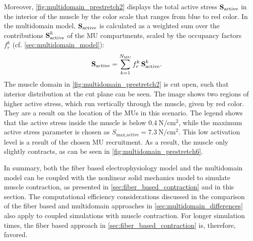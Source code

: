Moreover, \cref{fig:multidomain_prestretch2} displays the total active stress  $\textbf{S}_\text{active}$ in the interior of the muscle by the color scale that ranges from blue to red color. In the multidomain model, $\textbf{S}_\text{active}$ is calculated as a weighted sum over the contributions $\textbf{S}_\text{active}^k$ of the MU compartments, scaled by the occupancy factors $f_r^k$ (cf. \cref{sec:multidomain_model}):
\begin{align*}
  \textbf{S}_\text{active} = \sum\limits_{k=1}^{N_\text{MU}} f_r^k\,\textbf{S}_\text{active}^k.
\end{align*}
The muscle domain in \cref{fig:multidomain_prestretch2} is cut open, such that interior distribution at the cut plane can be seen. The image shows two regions of higher active stress, which run vertically through the muscle, given by red color. They are a result on the location of the MUs in this scenario. The legend shows that the active stress inside the muscle is below $\SI{0.4}{\newton\per\centi\meter\squared}$, while the maximum active stress parameter is chosen as $S_\text{max,active}=\SI{7.3}{\newton\per\centi\meter\squared}$. This low activation level is a result of the chosen MU recruitment. As a result, the muscle only slightly contracts, as can be seen in \cref{fig:multidomain_prestretch6}.

In summary, both the fiber based electrophysiology model and the multidomain model can be coupled with the nonlinear solid mechanics model to simulate muscle contraction, as presented in \cref{sec:fiber_based_contraction} and in this section. 
The computational efficiency considerations discussed in the comparison of the fiber based and multidomain approaches in \cref{sec:multidomain_differences} also apply to coupled simulations with muscle contraction. For longer simulation times, the fiber based approach in \cref{sec:fiber_based_contraction} is, therefore, favored.

